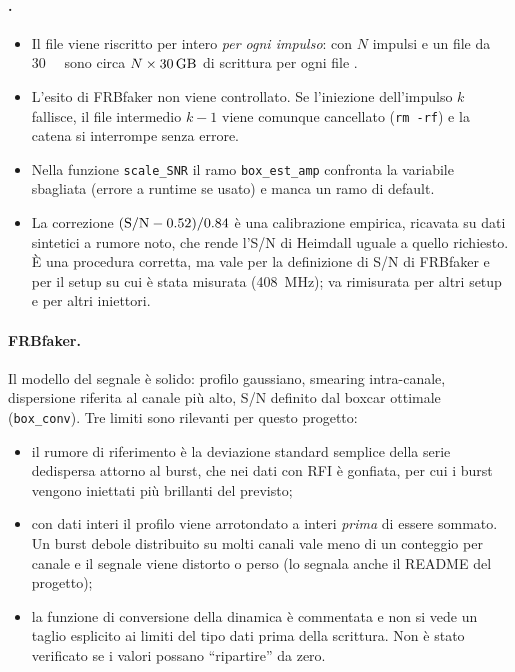 \documentclass[11pt,a4paper]{article}
\DeclareRobustCommand{\file}[1]{\texttt{\detokenize{#1}}}
\begin{document}
\paragraph{\file{FRB_injector.py}.}
\begin{itemize}
  \item Il file viene riscritto per intero \emph{per ogni impulso}: con $N$ impulsi e un file da \SI{30}{\giga\byte}
    sono circa $N\times\SI{30}{\giga\byte}$ di scrittura per ogni file \file{.params}.
  \item L'esito di FRBfaker non viene controllato. Se l'iniezione dell'impulso $k$ fallisce, il file intermedio
    $k-1$ viene comunque cancellato (\texttt{rm -rf}) e la catena si interrompe senza errore.
  \item Nella funzione \texttt{scale\_SNR} il ramo \texttt{box\_est\_amp} confronta la variabile sbagliata
    (errore a runtime se usato) e manca un ramo di default.
  \item La correzione $({\rm S/N}-0.52)/0.84$ è una calibrazione empirica, ricavata su dati sintetici a rumore
    noto, che rende l'S/N di Heimdall uguale a quello richiesto. È una procedura corretta, ma vale per la
    definizione di S/N di FRBfaker e per il setup su cui è stata misurata (\SI{408}{\mega\hertz}); va
    rimisurata per altri setup e per altri iniettori.
\end{itemize}

\paragraph{FRBfaker.} Il modello del segnale è solido: profilo gaussiano, smearing intra-canale, dispersione
riferita al canale più alto, S/N definito dal boxcar ottimale (\texttt{box\_conv}). Tre limiti sono rilevanti per
questo progetto:
\begin{itemize}
  \item il rumore di riferimento è la deviazione standard semplice della serie dedispersa attorno al burst,
    che nei dati con RFI è gonfiata, per cui i burst vengono iniettati più brillanti del previsto;
  \item con dati interi il profilo viene arrotondato a interi \emph{prima} di essere sommato. Un burst debole
    distribuito su molti canali vale meno di un conteggio per canale e il segnale viene distorto o perso
    (lo segnala anche il README del progetto);
  \item la funzione di conversione della dinamica è commentata e non si vede un taglio esplicito ai limiti del
    tipo dati prima della scrittura. Non è stato verificato se i valori possano ``ripartire'' da zero.
\end{itemize}
\end{document}
